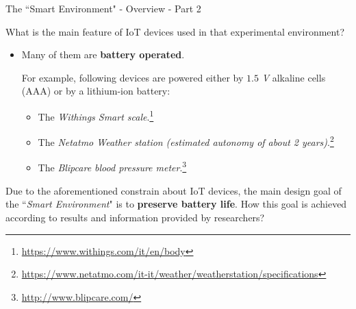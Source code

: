 \documentclass[10pt]{beamer}
\begin{document}
\begin{frame}{The ``Smart Environment" - Overview - Part 2}

\begin{alertblock}{}
\justifying
What is the main feature of IoT devices used in that experimental environment?
\end{alertblock}

\begin{itemize}
\item Many of them are \textbf{battery operated}.

For example, following devices are powered either by $1.5$ \textit{V} alkaline cells (AAA) or by a lithium-ion battery:

\begin{itemize}
\justifying
\item The \textit{Withings Smart scale}.\footnote{\url{https://www.withings.com/it/en/body}}

\item The \textit{Netatmo Weather station} \textit{(estimated autonomy of about 2 years)}.\footnote{\url{https://www.netatmo.com/it-it/weather/weatherstation/specifications}
}
\item The \textit{Blipcare blood pressure meter}.\footnote{\url{http://www.blipcare.com/}}
\end{itemize} 
\end{itemize} 

\begin{alertblock}{}
\justifying
Due to the aforementioned constrain about IoT devices, the main design goal of the ``\textit{Smart Environment}" is to \textbf{preserve battery life}. How this goal is achieved according to results and information provided by researchers?
\end{alertblock} 

\end{frame} 
\end{document}
